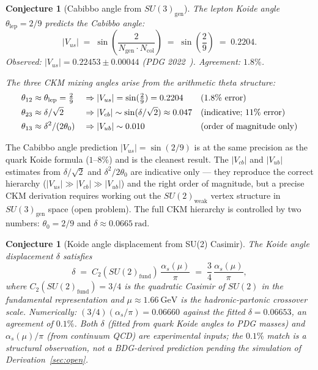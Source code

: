 \documentclass[11pt,a4paper]{article}
\newtheorem{conjecture}[theorem]{Conjecture}
\begin{document}
\begin{conjecture}[Cabibbo angle from $SU(3)_{\mathrm{gen}}$]
\label{conj:cabibbo}
The lepton Koide angle $\theta_{\mathrm{lep}} = 2/9$ predicts the Cabibbo
angle:
\begin{equation}
  |V_{us}| \;=\; \sin\!\left(\frac{2}{N_{\mathrm{gen}}\cdot N_{\mathrm{col}}}\right)
  \;=\; \sin\!\left(\frac{2}{9}\right) \;=\; 0.2204.
  \label{eq:cabibbo_pred}
\end{equation}
Observed: $|V_{us}| = 0.22453 \pm 0.00044$ (PDG 2022~\citep{PDG2022}).
Agreement: $1.8\%$.

The three CKM mixing angles arise from the arithmetic theta structure:
\begin{align}
  \theta_{12} &\approx \theta_{\mathrm{lep}} = \tfrac{2}{9}
    && \Rightarrow |V_{us}| = \sin(\tfrac{2}{9}) = 0.2204
    && \text{(1.8\% error)} \notag \\
  \theta_{23} &\approx \delta/\sqrt{2}
    && \Rightarrow |V_{cb}| \sim \sin(\delta/\sqrt{2}) \approx 0.047
    && \text{(indicative; 11\% error)} \notag \\
  \theta_{13} &\approx \delta^2/(2\theta_0)
    && \Rightarrow |V_{ub}| \sim 0.010
    && \text{(order of magnitude only)} \notag
\end{align}
\end{conjecture}

The Cabibbo angle prediction $|V_{us}| = \sin(2/9)$ is at the same
precision as the quark Koide formula ($1$--$8\%$) and is the cleanest
result. The $|V_{cb}|$ and $|V_{ub}|$ estimates from $\delta/\sqrt{2}$
and $\delta^2/2\theta_0$ are indicative only --- they reproduce the
correct hierarchy ($|V_{us}| \gg |V_{cb}| \gg |V_{ub}|$) and the right
order of magnitude, but a precise CKM derivation requires working out
the $SU(2)_{\mathrm{weak}}$ vertex structure in $SU(3)_{\mathrm{gen}}$
space (open problem). The full CKM hierarchy is controlled by two numbers:
$\theta_0 = 2/9$ and $\delta \approx 0.0665~\mathrm{rad}$.

\begin{conjecture}[Koide angle displacement from SU(2) Casimir]
\label{prop:delta_casimir}
The Koide angle displacement $\delta$ satisfies
\begin{equation}
  \delta \;=\; C_2\!\left(SU(2)_{\mathrm{fund}}\right)\,\frac{\alpha_s(\mu)}{\pi}
  \;=\; \frac{3}{4}\,\frac{\alpha_s(\mu)}{\pi},
  \label{eq:delta_casimir}
\end{equation}
where $C_2(SU(2)_{\mathrm{fund}}) = 3/4$ is the quadratic Casimir of $SU(2)$
in the fundamental representation and $\mu \approx 1.66~\mathrm{GeV}$
is the hadronic-partonic crossover scale.
Numerically: $(3/4)(\alpha_s/\pi) = 0.06660$ against the fitted
$\delta = 0.06653$, an agreement of $0.1\%$.
Both $\delta$ (fitted from quark Koide angles to PDG masses)
and $\alpha_s(\mu)/\pi$ (from continuum QCD) are experimental
inputs; the $0.1\%$ match is a structural observation, not a
BDG-derived prediction pending the simulation of Derivation~\ref{sec:open}.
\end{conjecture}
\end{document}
